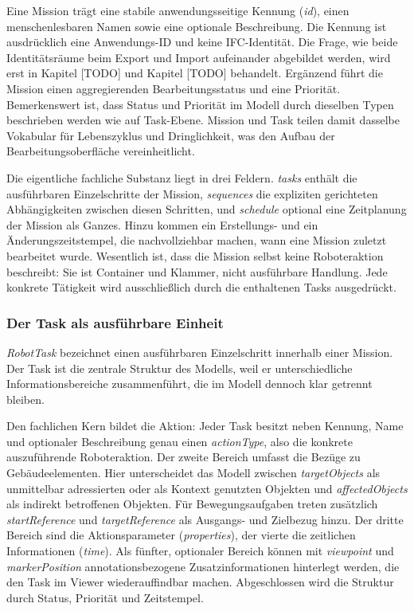 Eine Mission trägt eine stabile anwendungsseitige Kennung (\textit{id}), einen menschenlesbaren Namen sowie
eine optionale Beschreibung. Die Kennung ist ausdrücklich eine Anwendungs-ID und keine
IFC-Identität. Die Frage, wie beide Identitätsräume beim Export und Import aufeinander abgebildet
werden, wird erst in Kapitel [TODO] und Kapitel [TODO] behandelt. Ergänzend führt die Mission einen
aggregierenden Bearbeitungsstatus und eine Priorität. Bemerkenswert ist, dass Status und Priorität
im Modell durch dieselben Typen beschrieben werden wie auf Task-Ebene. Mission und Task teilen damit
dasselbe Vokabular für Lebenszyklus und Dringlichkeit, was den Aufbau der Bearbeitungsoberfläche
vereinheitlicht.

Die eigentliche fachliche Substanz liegt in drei Feldern. \textit{tasks} enthält die ausführbaren
Einzelschritte der Mission, \textit{sequences} die expliziten gerichteten Abhängigkeiten zwischen diesen
Schritten, und \textit{schedule} optional eine Zeitplanung der Mission als Ganzes. Hinzu kommen ein
Erstellungs- und ein Änderungszeitstempel, die nachvollziehbar machen, wann eine Mission zuletzt
bearbeitet wurde. Wesentlich ist, dass die Mission selbst keine Roboteraktion beschreibt: Sie ist
Container und Klammer, nicht ausführbare Handlung. Jede konkrete Tätigkeit wird ausschließlich durch
die enthaltenen Tasks ausgedrückt.

\subsubsection{Der Task als ausführbare Einheit}\label{Task_Einheit}
\textit{RobotTask} bezeichnet einen ausführbaren Einzelschritt innerhalb einer Mission. Der Task ist die
zentrale Struktur des Modells, weil er unterschiedliche Informationsbereiche zusammenführt, die im
Modell dennoch klar getrennt bleiben.

Den fachlichen Kern bildet die Aktion: Jeder Task besitzt neben Kennung, Name und optionaler
Beschreibung genau einen \textit{actionType}, also die konkrete auszuführende Roboteraktion. Der zweite
Bereich umfasst die Bezüge zu Gebäudeelementen. Hier unterscheidet das Modell zwischen
\textit{targetObjects} als unmittelbar adressierten oder als Kontext genutzten Objekten und
\textit{affectedObjects} als indirekt betroffenen Objekten. Für Bewegungsaufgaben treten zusätzlich
\textit{startReference} und \textit{targetReference} als Ausgangs- und Zielbezug hinzu. Der dritte Bereich sind
die Aktionsparameter (\textit{properties}), der vierte die zeitlichen Informationen (\textit{time}). Als fünfter,
optionaler Bereich können mit \textit{viewpoint} und \textit{markerPosition} annotationsbezogene
Zusatzinformationen hinterlegt werden, die den Task im Viewer wiederauffindbar machen. Abgeschlossen
wird die Struktur durch Status, Priorität und Zeitstempel.

